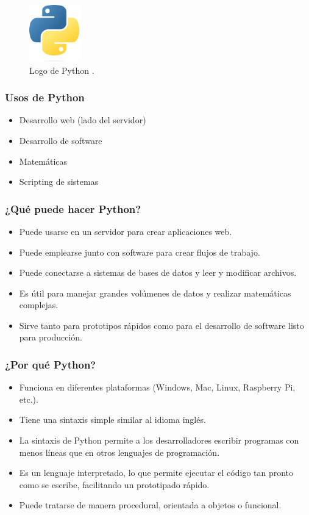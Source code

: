 \begin{figure}[!htbp]
  \centering
  \includegraphics[width=0.2\textwidth]{imagenes/02-marco-teorico/logo-python.png}
  \caption[Logo de Python]{Logo de Python \cite{Python_org}.}
  \label{fig:python-logo}
\end{figure}

\subsubsection{Usos de Python}

\begin{itemize}
  \item Desarrollo web (lado del servidor)
  \item Desarrollo de software
  \item Matemáticas
  \item Scripting de sistemas
\end{itemize}

\subsubsection{¿Qué puede hacer Python?}
\begin{itemize}
  \item Puede usarse en un servidor para crear aplicaciones web.
  \item Puede emplearse junto con software para crear flujos de trabajo.
  \item Puede conectarse a sistemas de bases de datos y leer y modificar archivos.
  \item Es útil para manejar grandes volúmenes de datos y realizar matemáticas complejas.
  \item Sirve tanto para prototipos rápidos como para el desarrollo de software listo para producción.
\end{itemize}

\subsubsection{¿Por qué Python?}
\begin{itemize}
  \item Funciona en diferentes plataformas (Windows, Mac, Linux, Raspberry Pi, etc.).
  \item Tiene una sintaxis simple similar al idioma inglés.
  \item La sintaxis de Python permite a los desarrolladores escribir programas con menos líneas que en otros lenguajes de programación.
  \item Es un lenguaje interpretado, lo que permite ejecutar el código tan pronto como se escribe, facilitando un prototipado rápido.
  \item Puede tratarse de manera procedural, orientada a objetos o funcional.
\end{itemize}

